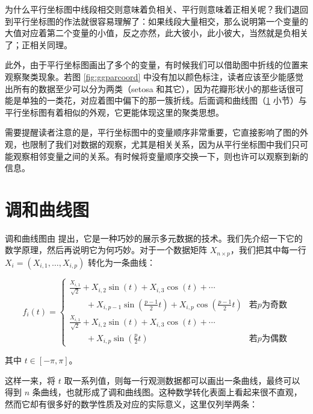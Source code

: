\documentclass[
  b5paper,
  UTF8,twoside]{book}
\begin{document}
为什么平行坐标图中线段相交则意味着负相关、平行则意味着正相关呢？我们退回到平行坐标图的作法就很容易理解了：如果线段大量相交，那么说明第一个变量的大值对应着第二个变量的小值，反之亦然，此大彼小，此小彼大，当然就是负相关了；正相关同理。

此外，由于平行坐标图画出了多个的变量，有时候我们可以借助图中折线的位置来观察聚类现象。若图 \ref{fig:ggparcoord}
中没有加以颜色标注，读者应该至少能感觉出所有的数据至少可以分为两类（setosa 和其它），因为花瓣形状小的那些话很可能是单独的一类花，对应着图中偏下的那一簇折线。后面调和曲线图（\ref{sec:andrews-curve} 小节）与平行坐标图有着相似的外观，它更能体现这里的聚类思想。

需要提醒读者注意的是，平行坐标图中的变量顺序非常重要，它直接影响了图的外观，也限制了我们对数据的观察，尤其是相关关系，因为从平行坐标图中我们只可能观察相邻变量之间的关系。有时候将变量顺序交换一下，则也许可以观察到新的信息。

\hypertarget{sec:andrews-curve}{%
\section{调和曲线图}\label{sec:andrews-curve}}

调和曲线图由 \citet{Andrews72} 提出，它是一种巧妙的展示多元数据的技术。我们先介绍一下它的数学原理，然后再说明它为何巧妙。对于一个数据矩阵 \(X_{n\times p}\)，我们把其中每一行 \(X_{i}=\left(X_{i,1},\ldots,X_{i,p}\right)\) 转化为一条曲线：

\begin{equation}
f_{i}(t)=\begin{cases}
\frac{X_{i,1}}{\sqrt{2}}+X_{i,2}\sin(t)+X_{i,3}\cos(t)+\cdots\\
\qquad+X_{i,p-1}\sin(\frac{p-1}{2}t)+X_{i,p}\cos(\frac{p-1}{2}t) & \text{若}p\text{为奇数}\\
\frac{X_{i,1}}{\sqrt{2}}+X_{i,2}\sin(t)+X_{i,3}\cos(t)+\cdots\\
\qquad+X_{i,p}\sin(\frac{p}{2}t) & \text{若}p\text{为偶数}
\end{cases} 
\label{eq:andrews-curve}
\end{equation}

其中 \(t\in[-\pi,\pi]\)。

这样一来，将 \(t\) 取一系列值，则每一行观测数据都可以画出一条曲线，最终可以得到 \(n\) 条曲线，也就形成了调和曲线图。这种数学转化表面上看起来很不直观，然而它却有很多好的数学性质及对应的实际意义，这里仅列举两条：
\end{document}
